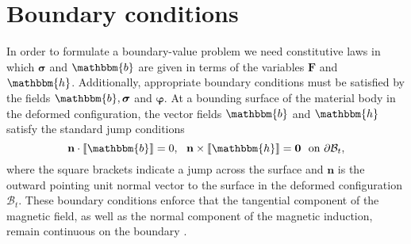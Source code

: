\section{Boundary conditions}
In order to formulate a boundary-value problem we need constitutive laws in which $\bm{\sigma}$ and $\mathbbm{b}$ are given in terms of the variables $\mathbf{F}$ and $\mathbbm{h}$. Additionally, appropriate boundary conditions must be satisfied by the fields $\mathbbm{b}, \bm{\sigma}$ and $\bm{\varphi}$. At a bounding surface of the material body in the deformed configuration, the vector fields $\mathbbm{b}$ and $\mathbbm{h}$ satisfy the standard jump conditions
\begin{equation}
\mathbf{n} \cdot \llbracket \mathbbm{b} \rrbracket = 0, \ \ \mathbf{n} \times \llbracket \mathbbm{h} \rrbracket = \mathbf{0} \ \ \text{on} \ \partial\mathcal{B}_t,
\label{eq:1.4}
\end{equation}
where the square brackets indicate a jump across the surface and $\mathbf{n}$ is the outward pointing unit normal vector to the surface in the deformed configuration $\mathcal{B}_t$. These boundary conditions enforce that the tangential component of the magnetic field, as well as the normal component of the magnetic induction, remain continuous on the boundary \cite{pelteret2016}.


